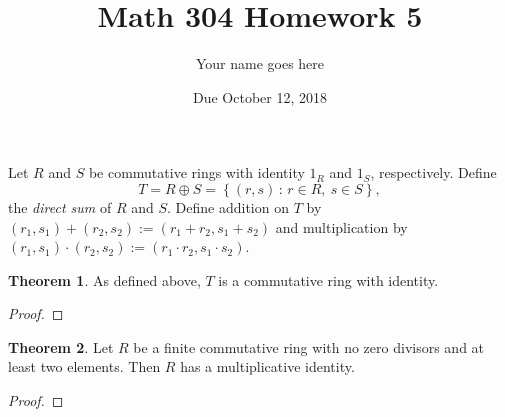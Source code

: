 \documentclass[11pt]{article}		%
\title{Math 304 Homework 5}
\author{Your name goes here}
\date{Due October 12, 2018}
\theoremstyle{definition}
\newtheorem{theorem}{Theorem}
\def\setof#1#2{{\left\{#1\,\colon\,#2\right\}}}
\begin{document}
\maketitle


 Let $R$ and $S$ be commutative rings with identity $1_R$ and $1_S$, respectively. 
 Define
	\[
		T = R\oplus S = \setof{(r,s)}{r\in R,\ s\in S},
	\]
	the \emph{direct sum} of $R$ and $S$.
	Define addition on $T$ by $(r_1,s_1) + (r_2,s_2) := (r_1 + r_2, s_1 + s_2)$ and multiplication by $(r_1,s_1) \cdot (r_2,s_2) := (r_1 \cdot r_2, s_1 \cdot s_2)$. 
	
	\begin{theorem}
		As defined above, $T$ is a commutative ring with identity.
	\end{theorem}

	\begin{proof}
		
	\end{proof}
	
	
	
	
	
	\begin{theorem}
		Let $R$ be a finite commutative ring with no zero divisors and at least two elements.
		Then $R$ has a multiplicative identity.
	\end{theorem}
	
	\begin{proof}
		
	\end{proof}
\end{document}
